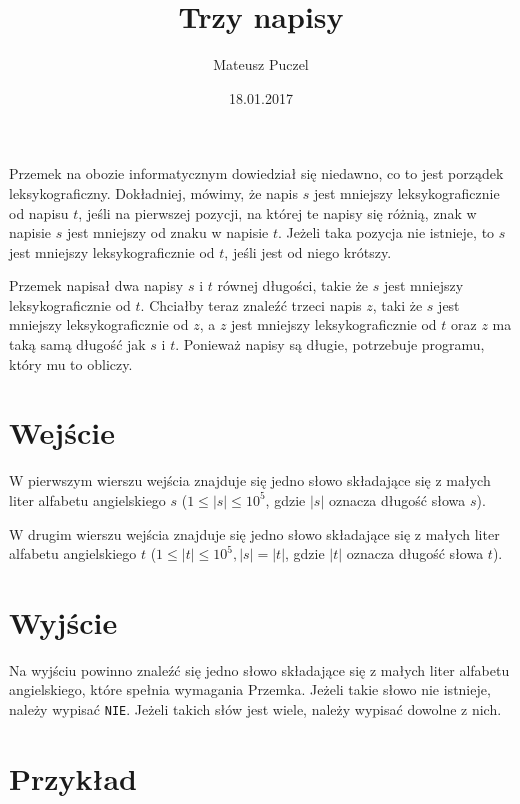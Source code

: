 \documentclass[zad,zawodnik,utf8]{sinol}
\title{Trzy napisy}
\author{Mateusz Puczel} %
\date{18.01.2017}
\begin{document}
\begin{tasktext}%

Przemek na obozie informatycznym dowiedział się niedawno, co to jest porządek leksykograficzny. Dokładniej, mówimy, że napis $s$ jest mniejszy
leksykograficznie od napisu $t$, jeśli na pierwszej pozycji, na której te napisy się różnią, znak w napisie $s$ jest mniejszy od znaku w napisie $t$.
Jeżeli taka pozycja nie istnieje, to $s$ jest mniejszy leksykograficznie od $t$, jeśli jest od niego krótszy.

Przemek napisał dwa napisy $s$ i $t$ równej długości, takie że $s$ jest mniejszy leksykograficznie od $t$.  Chciałby teraz znaleźć trzeci napis $z$,
taki że $s$ jest mniejszy leksykograficznie od $z$, a $z$ jest mniejszy leksykograficznie od $t$ oraz $z$ ma taką samą długość jak $s$ i $t$.
Ponieważ napisy są długie, potrzebuje programu, który mu to obliczy.

  \section{Wejście}
W pierwszym wierszu wejścia znajduje się jedno słowo składające się z małych liter alfabetu angielskiego $s$ ($1 \leq |s| \leq 10^5$, gdzie $|s|$ oznacza długość słowa $s$).

W drugim wierszu wejścia znajduje się jedno słowo składające się z małych liter alfabetu angielskiego $t$ ($1 \leq |t| \leq 10^5, |s| = |t|$, gdzie $|t|$ oznacza długość słowa $t$).

  \section{Wyjście}
Na wyjściu powinno znaleźć się jedno słowo składające się z małych liter alfabetu angielskiego, które spełnia wymagania Przemka. Jeżeli takie słowo nie istnieje,
należy wypisać \texttt{NIE}. Jeżeli takich słów jest wiele, należy wypisać dowolne z nich.

  \section{Przykład}

\end{tasktext}
\end{document}
